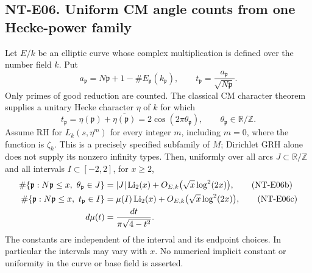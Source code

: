 \subsection*{NT-E06. Uniform CM angle counts from one Hecke-power family}
Let $E/k$ be an elliptic curve whose complex multiplication is defined
over the number field $k$. Put
\[
 a_{\mathfrak p}=N\mathfrak p+1-\#E_{\mathfrak p}(k_{\mathfrak p}),
 \qquad t_{\mathfrak p}=\frac{a_{\mathfrak p}}{\sqrt{N\mathfrak p}}.
\]
Only primes of good reduction are counted. The classical CM character
theorem supplies a unitary Hecke character $\eta$ of $k$ for which
\[
 t_{\mathfrak p}=\eta(\mathfrak p)+\overline{\eta(\mathfrak p)}
                =2\cos(2\pi\theta_{\mathfrak p}),
 \qquad \theta_{\mathfrak p}\in\mathbb R/\mathbb Z.       \tag{NT-E06a}
\]
Assume RH for $L_k(s,\eta^m)$ for every integer $m$, including
$m=0$, where the function is $\zeta_k$. This is a precisely specified
subfamily of $M$; Dirichlet GRH alone does not supply its nonzero
infinity types. Then, uniformly over all arcs $J\subset\mathbb R/\mathbb Z$
and all intervals $I\subset[-2,2]$, for $x\ge2$,
\begin{align}
 \#\{\mathfrak p:N\mathfrak p\le x,\ \theta_{\mathfrak p}\in J\}
   &= |J|\operatorname{Li}_2(x)
       +O_{E,k}\bigl(\sqrt x\log^2(2x)\bigr), \tag{NT-E06b}\\
 \#\{\mathfrak p:N\mathfrak p\le x,\ t_{\mathfrak p}\in I\}
   &= \mu(I)\operatorname{Li}_2(x)
       +O_{E,k}\bigl(\sqrt x\log^2(2x)\bigr), \tag{NT-E06c}\\
 d\mu(t)&=\frac{dt}{\pi\sqrt{4-t^2}}.\notag
\end{align}
The constants are independent of the interval and its endpoint choices.
In particular the intervals may vary with $x$. No numerical implicit
constant or uniformity in the curve or base field is asserted.

